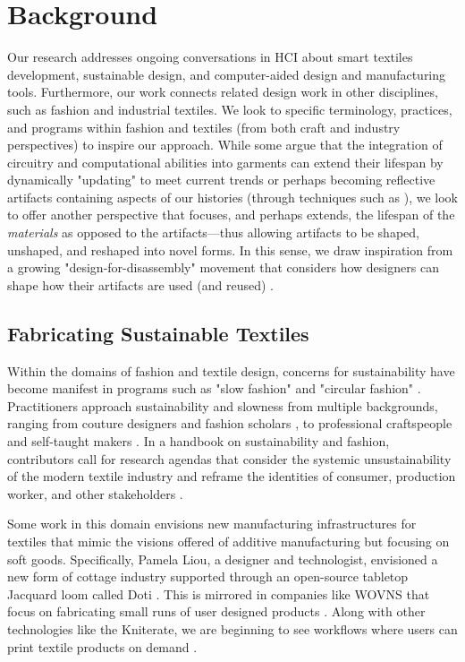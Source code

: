 \documentclass{sigchi}
\begin{document}
\section{Background}
Our research addresses ongoing conversations in HCI about smart textiles development, sustainable design, and computer-aided design and manufacturing tools. Furthermore, our work connects related design work in other disciplines, such as fashion and industrial textiles. We look to specific terminology, practices, and programs within fashion and textiles (from both craft and industry perspectives) to inspire our approach.  While some argue that the integration of circuitry and computational abilities into garments can extend their lifespan by dynamically "updating" to meet current trends  \cite{ivan_keynote} or perhaps becoming reflective artifacts containing aspects of our histories (through techniques such as \cite{rosner_spyn:_2008}), we look to offer another perspective that focuses, and perhaps extends, the lifespan of the \textit{materials} as opposed to the artifacts---thus allowing artifacts to be shaped, unshaped, and reshaped into novel forms. In this sense, we draw inspiration from a growing "design-for-disassembly" movement that considers how designers can shape how their artifacts are used (and reused) \cite{webster_dfd, circular_disassembly}.

\subsection{Fabricating Sustainable Textiles}
Within the domains of fashion and textile design, concerns for sustainability have become manifest in programs such as "slow fashion" \cite{phelan_what_2017} and "circular fashion" \cite{circular_fashion}. Practitioners approach sustainability and slowness from multiple backgrounds, ranging from couture designers \cite{piper_crafting_2015} and fashion scholars \cite{fletcher_sustainability_2014, fletcher_craft_2016}, to professional craftspeople \cite{essen_easysupp_2016, unravellingclub} and self-taught makers \cite{ravelry_thriftyknitters}. In a handbook on sustainability and fashion, contributors call for research agendas that consider the systemic unsustainability of the modern textile industry and reframe the identities of consumer, production worker, and other stakeholders \cite{fletcher_sustainability_2014}.

Some work in this domain envisions new manufacturing infrastructures for textiles that mimic the visions offered of additive manufacturing but focusing on soft goods. Specifically, Pamela Liou, a designer and technologist, envisioned a new form of cottage industry supported through an open-source tabletop Jacquard loom called Doti \cite{liou_doti:_2015}. This is mirrored in companies like WOVNS that focus on fabricating small runs of user designed products \cite{wovns}. Along with other technologies like the Kniterate, we are beginning to see workflows where users can print textile products on demand \cite{kniterate}. 
\end{document}
